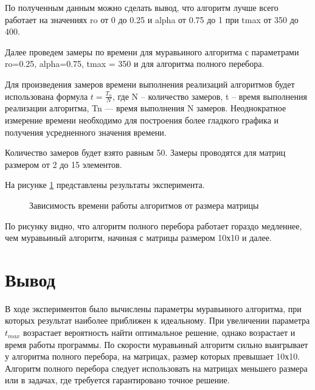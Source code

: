 \newpage
По полученным данным можно сделать вывод, что алгоритм лучше всего работает на значениях ro от 0 до 0.25 и alpha от 0.75 до 1 при tmax от 350 до 400.

Далее проведем замеры по времени для муравьиного алгоритма с параметрами ro=0.25, alpha=0.75, tmax = 350 и для алгоритма полного перебора.

Для произведения замеров времени выполнения реализаций алгоритмов будет использована формула $t=\frac{T_{n}}{N}$, где N – количество замеров, t – время выполнения реализации алгоритма, Tn — время выполнения N замеров. Неоднократное измерение времени необходимо для построения более гладкого графика и получения усредненного значения времени.

Количество замеров будет взято равным 50. Замеры проводятся для матриц размером от 2 до 15 элементов.

На рисунке \ref{graphics} представлены результаты эксперимента.

\newpage
\begin{figure}[h]
	\caption{Зависимость времени работы алгоритмов от размера матрицы}
	\label{graphics}
\end{figure}

По рисунку видно, что алгоритм полного перебора  работает гораздо медленнее, чем муравьиный алгоритм, начиная с матрицы размером 10х10 и далее.

\section{Вывод}
В ходе экспериментов было вычислены параметры муравьиного алгоритма, при которых результат наиболее приближен к идеальному. При увеличении параметра $t_{max}$ возрастает вероятность найти оптимальное решение, однако возрастает и время работы программы. По скорости муравьиный алгоритм сильно выигрывает у алгоритма полного перебора, на матрицах, размер которых превышает 10х10. Алгоритм полного перебора следует использовать на матрицах меньшего размера или в задачах, где требуется гарантировано точное решение.
